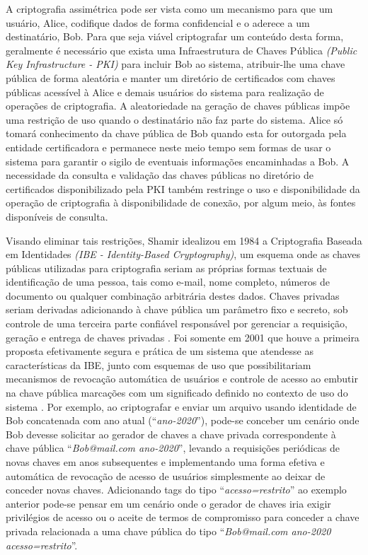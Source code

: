 \documentclass[a4paper,11pt]{article}
\begin{document}
A criptografia assimétrica pode ser vista como um mecanismo para que um usuário, Alice, codifique dados de forma confidencial e o aderece a um destinatário, Bob.
Para que seja viável criptografar um conteúdo desta forma, geralmente é necessário que exista uma Infraestrutura de Chaves Pública \emph{(Public Key Infrastructure - PKI)} para incluir Bob ao sistema, atribuir-lhe uma chave pública de forma aleatória e manter um diretório de certificados com chaves públicas acessível à Alice e demais usuários do sistema para realização de operações de criptografia.
A aleatoriedade na geração de chaves públicas impõe uma restrição de uso quando o destinatário não faz parte do sistema.
Alice só tomará conhecimento da chave pública de Bob quando esta for outorgada pela entidade certificadora e permanece neste meio tempo sem formas de usar o sistema para garantir o sigilo de eventuais informações encaminhadas a Bob.
A necessidade da consulta e validação das chaves públicas no diretório de certificados disponibilizado pela PKI também restringe o uso e disponibilidade da operação de criptografia à disponibilidade de conexão, por algum meio, às fontes disponíveis de consulta.

Visando eliminar tais restrições, Shamir idealizou em 1984 a Criptografia Baseada em Identidades \emph{(IBE - Identity-Based Cryptography)}, um esquema onde as chaves públicas utilizadas para criptografia seriam as próprias formas textuais de identificação de uma pessoa, tais como e-mail, nome completo, números de documento ou qualquer combinação arbitrária destes dados.
Chaves privadas seriam derivadas adicionando à chave pública um parâmetro fixo e secreto, sob controle de uma terceira parte confiável responsável por gerenciar a requisição, geração e entrega de chaves privadas \cite{Shamir1985}.
Foi somente em 2001 que houve a primeira proposta efetivamente segura e prática de um sistema que atendesse as características da IBE, junto com esquemas de uso que possibilitariam mecanismos de revocação automática de usuários e controle de acesso ao embutir na chave pública marcações com um significado definido no contexto de uso do sistema \cite{Boneh2001}.
Por exemplo, ao criptografar e enviar um arquivo usando identidade de Bob concatenada com ano atual (``\emph{ano-2020}''), pode-se conceber um cenário onde Bob devesse solicitar ao gerador de chaves a chave privada correspondente à chave pública ``\emph{Bob@mail.com ano-2020}'', levando a requisições periódicas de novas chaves em anos subsequentes e implementando uma forma efetiva e automática de revocação de acesso de usuários simplesmente ao deixar de conceder novas chaves.
Adicionando tags do tipo ``\emph{acesso=restrito}'' ao exemplo anterior pode-se pensar em um cenário onde o gerador de chaves iria exigir privilégios de acesso ou o aceite de termos de compromisso para conceder a chave privada relacionada a uma chave pública do tipo ``\emph{Bob@mail.com ano-2020 acesso=restrito}''.
\end{document}
